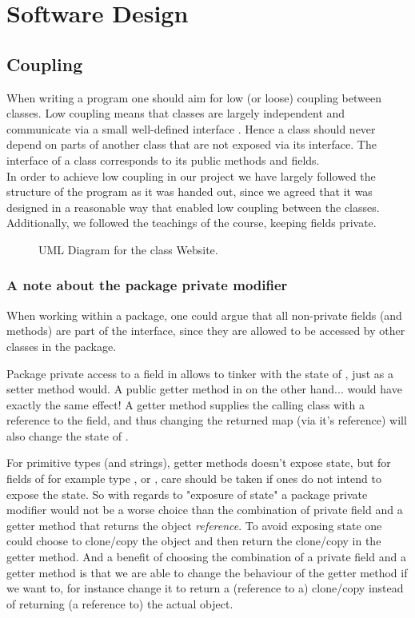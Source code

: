 \section{Software Design}

\subsection{Coupling}
When writing a program one should aim for low (or loose) coupling between classes. Low coupling means that classes are largely independent and communicate via a small well-defined interface \cite[p.259]{BK}. Hence a class should never depend on parts of another class that are not exposed via its interface. The interface of a class corresponds to its public methods and fields.
\\
In order to achieve low coupling in our project we have largely followed the structure of the program as it was handed out, since we agreed that it was designed in a reasonable way that enabled low coupling between the classes. Additionally, we followed the teachings of the course, keeping fields private.

 \begin{figure}[t]
	\centering
	\caption{UML Diagram for the class Website.}
	\label{fig:uml:single-class-website}
\end{figure}

 
\subsubsection{A note about the package private modifier}
When working within a package, one could argue that all non-private fields (and methods) are part of the interface, since they are allowed to be accessed by other classes in the package. 
 
Package private access to a field in  allows  to tinker with the state of , just as a setter method would.
A public getter method in  on the other hand... would have exactly the same effect!
A getter method supplies the calling class  with a reference to the field, and thus changing the returned map (via it's reference) will also change the state of .
 
For primitive types (and strings), getter methods doesn't expose state, but for fields of for example type ,  or , care should be taken if ones do not intend to expose the state.
So with regards to "exposure of state" a package private modifier would not be a worse choice than the combination of private field and a getter method that returns the object \emph{reference}. To avoid exposing state one could choose to clone/copy the object and then return the clone/copy in the getter method.
And a benefit of choosing the combination of a private field and a getter method is that we are able to change the behaviour of the getter method if we want to, for instance change it to return a (reference to a) clone/copy instead of returning (a reference to) the actual object. 

